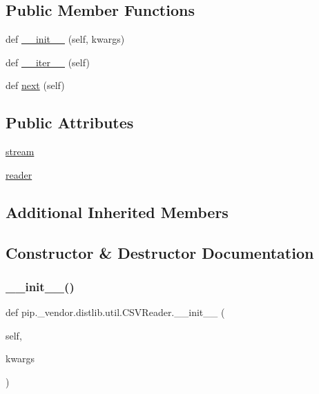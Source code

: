 \subsection*{Public Member Functions}
\begin{DoxyCompactItemize}
\item 
def \hyperlink{classpip_1_1__vendor_1_1distlib_1_1util_1_1CSVReader_a0aef11be2caf4cb1d0e04e1d9f1fdae5}{\+\_\+\+\_\+init\+\_\+\+\_\+} (self, kwargs)
\item 
def \hyperlink{classpip_1_1__vendor_1_1distlib_1_1util_1_1CSVReader_a112610bbf451b386bfaac0a508c626a7}{\+\_\+\+\_\+iter\+\_\+\+\_\+} (self)
\item 
def \hyperlink{classpip_1_1__vendor_1_1distlib_1_1util_1_1CSVReader_a672415c10536bbf4e1137c96ca5e5343}{next} (self)
\end{DoxyCompactItemize}
\subsection*{Public Attributes}
\begin{DoxyCompactItemize}
\item 
\hyperlink{classpip_1_1__vendor_1_1distlib_1_1util_1_1CSVReader_a18318328ab4659c139c9340139603268}{stream}
\item 
\hyperlink{classpip_1_1__vendor_1_1distlib_1_1util_1_1CSVReader_a68be1a03c00fe29178becd3bf87df452}{reader}
\end{DoxyCompactItemize}
\subsection*{Additional Inherited Members}


\subsection{Constructor \& Destructor Documentation}
\mbox{\label{classpip_1_1__vendor_1_1distlib_1_1util_1_1CSVReader_a0aef11be2caf4cb1d0e04e1d9f1fdae5}} 
\subsubsection{\texorpdfstring{\+\_\+\+\_\+init\+\_\+\+\_\+()}{\_\_init\_\_()}}
{\footnotesize\ttfamily def pip.\+\_\+vendor.\+distlib.\+util.\+C\+S\+V\+Reader.\+\_\+\+\_\+init\+\_\+\+\_\+ (\begin{DoxyParamCaption}\item[{}]{self,  }\item[{}]{kwargs }\end{DoxyParamCaption})}



